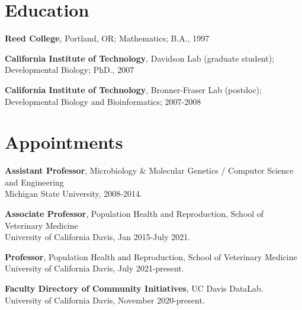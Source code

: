\documentclass[margin,line]{resume}
\begin{document}
\pagestyle{plain}


\begin{resume}




    \section{\mysidestyle Education}

    {\bf Reed College}, Portland, OR; Mathematics; B.A., 1997

    \vspace{2mm}

    {\bf California Institute of Technology}, Davidson Lab (graduate student);
\\
Developmental Biology; PhD., 2007

    \vspace{2mm}

    {\bf California Institute of Technology}, Bronner-Fraser Lab (postdoc);\\
 Developmental Biology and Bioinformatics; 2007-2008

    \vspace{2mm}

    \section{\mysidestyle Appointments}

    {\bf Assistant Professor}, 
Microbiology \& Molecular Genetics / Computer Science and Engineering\\
Michigan State University, 2008-2014.

    {\bf Associate Professor}, 
Population Health and Reproduction, School of Veterinary Medicine \\
University of California Davis, Jan 2015-July 2021.

    {\bf Professor}, 
Population Health and Reproduction, School of Veterinary Medicine \\
University of California Davis, July 2021-present.

    {\bf Faculty Directory of Community Initiatives}, UC Davis DataLab. \\
    University of California Davis, November 2020-present.


\end{resume}
\end{document}
